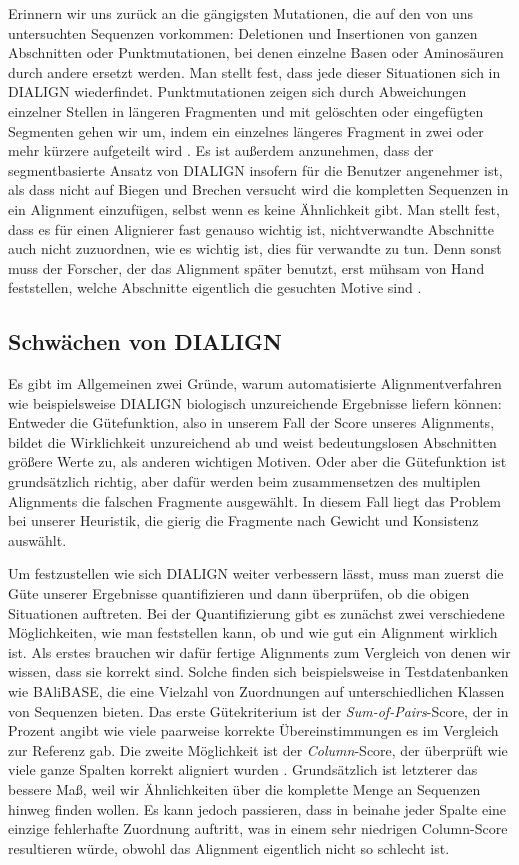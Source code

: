 Erinnern wir uns zurück an die gängigsten Mutationen, die auf den von uns untersuchten Sequenzen vorkommen: Deletionen und Insertionen von ganzen Abschnitten oder Punktmutationen, bei denen einzelne Basen oder Aminosäuren durch andere ersetzt werden. Man stellt fest, dass jede dieser Situationen sich in DIALIGN wiederfindet. Punktmutationen zeigen sich durch Abweichungen einzelner Stellen in längeren Fragmenten und mit gelöschten oder eingefügten Segmenten gehen wir um, indem ein einzelnes längeres Fragment in zwei oder mehr kürzere aufgeteilt wird \cite{mfdw98}. Es ist außerdem anzunehmen, dass der segmentbasierte Ansatz von DIALIGN insofern für die Benutzer angenehmer ist, als dass nicht auf Biegen und Brechen versucht wird die kompletten Sequenzen in ein Alignment einzufügen, selbst wenn es keine Ähnlichkeit gibt. Man stellt fest, dass es für einen Alignierer fast genauso wichtig ist, nichtverwandte Abschnitte auch nicht zuzuordnen, wie es wichtig ist, dies für verwandte zu tun. Denn sonst muss der Forscher, der das Alignment später benutzt, erst mühsam von Hand feststellen, welche Abschnitte eigentlich die gesuchten Motive sind \cite{m99}.

\subsection{Schwächen von DIALIGN}

Es gibt im Allgemeinen zwei Gründe, warum automatisierte Alignmentverfahren wie beispielsweise DIALIGN biologisch unzureichende Ergebnisse liefern können: Entweder die Gütefunktion, also in unserem Fall der Score unseres Alignments, bildet die Wirklichkeit unzureichend ab und weist bedeutungslosen Abschnitten größere Werte zu, als anderen wichtigen Motiven. Oder aber die Gütefunktion ist grundsätzlich richtig, aber dafür werden beim zusammensetzen des multiplen Alignments die falschen Fragmente ausgewählt. In diesem Fall liegt das Problem bei unserer Heuristik, die gierig die Fragmente nach Gewicht und Konsistenz auswählt. 

Um festzustellen wie sich DIALIGN weiter verbessern lässt, muss man zuerst die Güte unserer Ergebnisse quantifizieren und dann überprüfen, ob die obigen Situationen auftreten. Bei der Quantifizierung gibt es zunächst zwei verschiedene Möglichkeiten, wie man feststellen kann, ob und wie gut ein Alignment wirklich ist. Als erstes brauchen wir dafür fertige Alignments zum Vergleich von denen wir wissen, dass sie korrekt sind. Solche finden sich beispielsweise in Testdatenbanken wie BAliBASE, die eine Vielzahl von Zuordnungen auf unterschiedlichen Klassen von Sequenzen bieten. Das erste Gütekriterium ist der \emph{Sum-of-Pairs}-Score, der in Prozent angibt wie viele paarweise korrekte Übereinstimmungen es im Vergleich zur Referenz gab. Die zweite Möglichkeit ist der \emph{Column}-Score, der überprüft wie viele ganze Spalten korrekt aligniert wurden \cite{mpps06}. Grundsätzlich ist letzterer das bessere Maß, weil wir Ähnlichkeiten über die komplette Menge an Sequenzen hinweg finden wollen. Es kann jedoch passieren, dass in beinahe jeder Spalte eine einzige fehlerhafte Zuordnung auftritt, was in einem sehr niedrigen Column-Score resultieren würde, obwohl das Alignment eigentlich nicht so schlecht ist.

